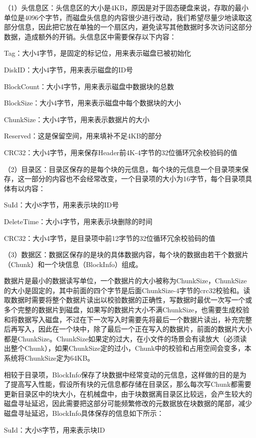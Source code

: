 （1）头信息区：头信息区的大小是4KB，原因是对于固态硬盘来说，存取的最小单位是4096个字节，而磁盘头信息的内容很少进行改动，我们希望尽量少地读取这部分信息，因此把它放在单独的一个扇区内，避免读写其他数据时多次访问这部分数据，造成额外的开销。头信息区中需要保存以下内容：

Tag：大小4字节，是固定的标记位，用来表示磁盘已被初始化

DiskID：大小4字节，用来表示磁盘的ID号

BlockCount：大小4字节，用来表示磁盘中数据块的总数

BlockSize：大小4字节，用来表示磁盘中每个数据块的大小

ChunkSize：大小4字节，用来表示数据片的大小

Reserved：这是保留空间，用来填补不足4KB的部分

CRC32：大小4字节，用来保存Header前4K-4字节的32位循环冗余校验码的值

（2）目录区：目录区保存的是每个块的元信息，每个块的元信息一个目录项来保存，这一部分的内容也不会经常改变，一个目录项的大小为16字节，每个目录项具体有以内容：

SuId：大小8字节，用来表示块的ID号

DeleteTime：大小4字节，用来表示块删除的时间

CRC32：大小4字节，是目录项中前12字节的32位循环冗余校验码的值

（3）数据区：数据区保存的是块的具体数据内容，每个块的数据由若干个数据片（Chunk）和一个块信息（BlockInfo）组成。

数据片是最小的数据读写单位，一个数据片的大小被称为ChunkSize，ChunkSize的大小是固定的，其中前面的四个字节是后面ChunkSize-4字节的crc32校验和。读取数据时需要将整个数据片读出以校验数据的正确性，写数据时最优一次写一个或多个完整的数据片到磁盘，如果写的数据片大小不满ChunkSize，也需要生成校验和将数据写入磁盘，不过在下一次写入时需要先将最后一个数据片读出，补充完整后再写入，因此在一个块中，除了最后一个正在写入的数据片，前面的数据片大小都是ChunkSize。ChunkSize如果定的过大，在小文件的场景会有读放大（必须读出整个Chunk），如果ChunkSize定的过小，Chunk中的校验和占用空间会变多，本系统将ChunkSize定为64KB。

相较于目录项，BlockInfo保存了块数据中经常变动的元信息，这样做的目的是为了提高写入性能，假设所有块的元信息都存储在目录区，那么每次写Chunk都需要更新目录区中的块大小，在机械盘中，由于块数据离目录区比较远，会产生较大的磁盘寻址延迟，因此需要把这部分可能频繁修改的元数据放在块数据的尾部，减少磁盘寻址延迟，BlockInfo具体保存的信息如下所示：

SuId：大小8字节，用来表示块ID

